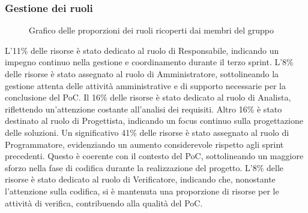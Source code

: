 \subsubsection{Gestione dei ruoli}

\begin{figure}[h]
	\centering
    \caption{Grafico delle proporzioni dei ruoli ricoperti dai membri del gruppo}
\end{figure}

L'11\% delle risorse è stato dedicato al ruolo di Responsabile, indicando un impegno continuo nella gestione e coordinamento durante il terzo sprint.
L'8\% delle risorse è stato assegnato al ruolo di Amministratore, sottolineando la gestione attenta delle attività amministrative e di supporto necessarie per la conclusione del PoC.
Il 16\% delle risorse è stato dedicato al ruolo di Analista, riflettendo un'attenzione costante all'analisi dei requisiti.
Altro 16\% è stato destinato al ruolo di Progettista, indicando un focus continuo sulla progettazione delle soluzioni.
Un significativo 41\% delle risorse è stato assegnato al ruolo di Programmatore, evidenziando un aumento considerevole rispetto agli sprint precedenti. 
Questo è coerente con il contesto del PoC, sottolineando un maggiore sforzo nella fase di codifica durante la realizzazione del progetto.
L'8\% delle risorse è stato dedicato al ruolo di Verificatore, indicando che, nonostante l'attenzione sulla codifica, si è mantenuta una proporzione di risorse per le attività di verifica, contribuendo alla qualità del PoC.





